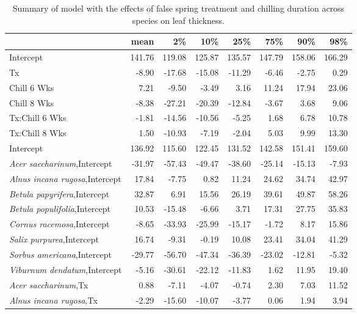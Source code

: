 \documentclass{article}\usepackage[]{graphicx}\usepackage[]{color}
\begin{document}
\newpage
\begin{longtable}{lrrrrrrr}
\caption{Summary of model with the effects of false spring treatment and chilling duration across species on leaf thickness.} \\ 
  \hline
 & mean & 2\% & 10\% & 25\% & 75\% & 90\% & 98\% \\ 
  \hline \endhead  \hline
Intercept & 141.76 & 119.08 & 125.87 & 135.57 & 147.79 & 158.06 & 166.29 \\ 
  Tx & -8.90 & -17.68 & -15.08 & -11.29 & -6.46 & -2.75 & 0.29 \\ 
  Chill 6 Wks & 7.21 & -9.50 & -3.49 & 3.16 & 11.24 & 17.94 & 23.06 \\ 
  Chill 8 Wks & -8.38 & -27.21 & -20.39 & -12.84 & -3.67 & 3.68 & 9.06 \\ 
  Tx:Chill 6 Wks & -1.81 & -14.56 & -10.56 & -5.25 & 1.68 & 6.78 & 10.78 \\ 
  Tx:Chill 8 Wks & 1.50 & -10.93 & -7.19 & -2.04 & 5.03 & 9.99 & 13.30 \\ 
  Intercept & 136.92 & 115.60 & 122.45 & 131.52 & 142.58 & 151.41 & 159.60 \\ 
  \textit{Acer saccharinum},Intercept & -31.97 & -57.43 & -49.47 & -38.60 & -25.14 & -15.13 & -7.93 \\ 
  \textit{Alnus incana rugosa},Intercept & 17.84 & -7.75 & 0.82 & 11.24 & 24.62 & 34.74 & 42.97 \\ 
  \textit{Betula papyrifera},Intercept & 32.87 & 6.91 & 15.56 & 26.19 & 39.61 & 49.87 & 58.26 \\ 
  \textit{Betula populifolia},Intercept & 10.53 & -15.48 & -6.66 & 3.71 & 17.31 & 27.75 & 35.83 \\ 
  \textit{Cornus racemosa},Intercept & -8.65 & -33.93 & -25.99 & -15.17 & -1.72 & 8.17 & 15.86 \\ 
  \textit{Salix purpurea},Intercept & 16.74 & -9.31 & -0.19 & 10.08 & 23.41 & 34.04 & 41.29 \\ 
  \textit{Sorbus americana},Intercept & -29.77 & -56.70 & -47.34 & -36.39 & -23.02 & -12.81 & -5.32 \\ 
  \textit{Viburnum dendatum},Intercept & -5.16 & -30.61 & -22.12 & -11.83 & 1.62 & 11.95 & 19.40 \\ 
  \textit{Acer saccharinum},Tx & 0.88 & -7.11 & -4.07 & -0.74 & 2.30 & 7.03 & 11.52 \\ 
  \textit{Alnus incana rugosa},Tx & -2.29 & -15.60 & -10.07 & -3.77 & 0.06 & 1.94 & 3.94 \\ 

\end{longtable}
\end{document}
